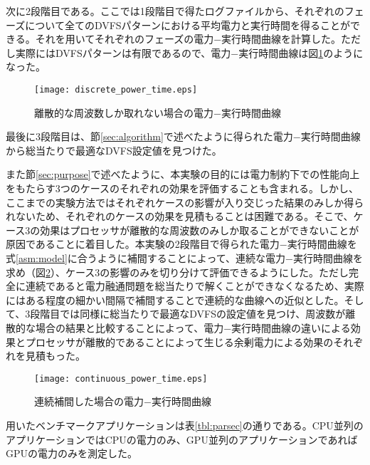 次に2段階目である。ここでは1段階目で得たログファイルから、それぞれのフェーズについて全てのDVFSパターンにおける平均電力と実行時間を得ることができる。それを用いてそれぞれのフェーズの電力−実行時間曲線を計算した。ただし実際にはDVFSパターンは有限であるので、電力−実行時間曲線は図\ref{fig:discrete_power_time}のようになった。

\begin{figure}[t]
 \begin{center}
  \texttt{[image: discrete\_power\_time.eps]}
 \end{center}
 \caption{離散的な周波数しか取れない場合の電力−実行時間曲線}
 \label{fig:discrete_power_time}
\end{figure}

最後に3段階目は、節\ref{sec:algorithm}で述べたように得られた電力−実行時間曲線から総当たりで最適なDVFS設定値を見つけた。

また節\ref{sec:purpose}で述べたように、本実験の目的には電力制約下での性能向上をもたらす3つのケースのそれぞれの効果を評価することも含まれる。しかし、ここまでの実験方法ではそれぞれケースの影響が入り交じった結果のみしか得られないため、それぞれのケースの効果を見積もることは困難である。そこで、ケース3の効果はプロセッサが離散的な周波数のみしか取ることができないことが原因であることに着目した。本実験の2段階目で得られた電力−実行時間曲線を式\ref{asm:model}に合うように補間することによって、連続な電力−実行時間曲線を求め（図\ref{fig:continuous_power_time}）、ケース3の影響のみを切り分けて評価できるようにした。ただし完全に連続であると電力融通問題を総当たりで解くことができなくなるため、実際にはある程度の細かい間隔で補間することで連続的な曲線への近似とした。そして、3段階目では同様に総当たりで最適なDVFSの設定値を見つけ、周波数が離散的な場合の結果と比較することによって、電力−実行時間曲線の違いによる効果とプロセッサが離散的であることによって生じる余剰電力による効果のそれぞれを見積もった。

\begin{figure}[t]
 \begin{center}
  \texttt{[image: continuous\_power\_time.eps]}
 \end{center}
 \caption{連続補間した場合の電力−実行時間曲線}
 \label{fig:continuous_power_time}
\end{figure}

用いたベンチマークアプリケーションは表\ref{tbl:parsec}の通りである。CPU並列のアプリケーションではCPUの電力のみ、GPU並列のアプリケーションであればGPUの電力のみを測定した。

